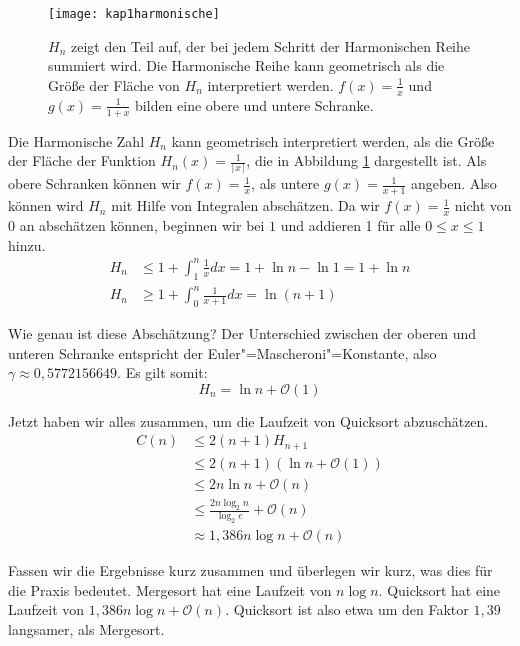 \begin{Lza}[Quicksort]
\begin{figure}[hbt]
  \centering
  \texttt{[image: kap1harmonische]}
  \caption{$H_n$ zeigt den Teil auf, der bei jedem Schritt der Harmonischen Reihe summiert wird. Die Harmonische Reihe kann geometrisch als die Größe der Fläche von $H_n$ interpretiert werden. $f(x)=\frac{1}{x}$ und $g(x)=\frac{1}{1+x}$ bilden eine obere und untere Schranke.}
  \label{harmonische}
\end{figure}

Die Harmonische Zahl $H_n$ kann geometrisch interpretiert werden, als die Größe der Fläche der Funktion $H_n(x) = \frac{1}{\lceil x \rceil}$, die in Abbildung \ref{harmonische} dargestellt ist. Als obere Schranken können wir $f(x) = \frac{1}{x}$, als untere $g(x) = \frac{1}{x+1}$ angeben. Also können wird $H_n$ mit Hilfe von Integralen abschätzen. Da wir $f(x) = \frac{1}{x}$ nicht von $0$ an abschätzen können, beginnen wir bei $1$ und addieren 1 für alle $ 0 \le x \le 1$ hinzu.
\begin{align*}
  H_n &\le 1 + \int_{1}^{n} \frac{1}{x} dx = 1 + \ln n - \ln 1 = 1 + \ln n \\
  H_n &\ge 1 + \int_{0}^{n} \frac{1}{x+1} dx = \ln (n+1) 
\end{align*}

Wie genau ist diese Abschätzung? Der Unterschied zwischen der oberen und unteren Schranke entspricht der Euler"=Mascheroni"=Konstante, also $\gamma \approx 0,5772156649$. Es gilt somit:
\[ H_n = \ln n + \mathcal{O}(1) \]

Jetzt haben wir alles zusammen, um die Laufzeit von Quicksort abzuschätzen.
\begin{align*}
  C(n) &\le 2(n+1) H_{n+1} \\
       &\le 2(n+1) (\ln n + \mathcal{O}(1)) \\
       &\le 2n \ln n + \mathcal{O}(n) \\
       &\le \frac{2n \log_2 n}{\log_2 e} + \mathcal{O}(n) \\
       &\approx 1,386 n \log n + \mathcal{O}(n)
\end{align*}
\end{Lza}

Fassen wir die Ergebnisse kurz zusammen und überlegen wir kurz, was dies für die Praxis bedeutet. Mergesort hat eine Laufzeit von $n \log n$. Quicksort hat eine Laufzeit von $1,386 n \log n + \mathcal{O}(n)$. Quicksort ist also etwa um den Faktor $1,39$ langsamer, als Mergesort.

